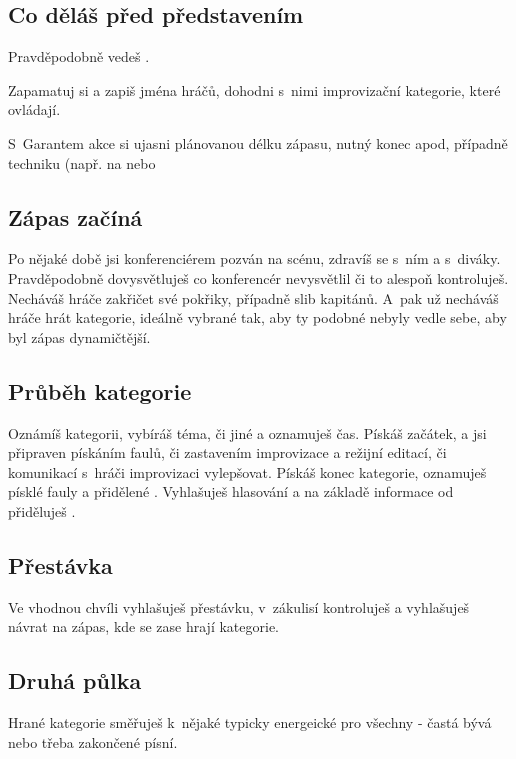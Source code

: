 \subsection{ Co děláš před představením } Pravděpodobně vedeš . 
 
Zapamatuj si a zapiš jména hráčů, dohodni s~nimi improvizační kategorie, které ovládají. 
 
S~Garantem akce si ujasni plánovanou délku zápasu, nutný konec apod, případně techniku (např. na  nebo  
 
\subsection{ Zápas začíná } Po nějaké době jsi konferenciérem pozván na scénu, zdravíš se s~ním a s~diváky. 
Pravděpodobně dovysvětluješ co konferencér nevysvětlil či to alespoň kontroluješ. 
Necháváš hráče zakřičet své pokřiky, případně slib kapitánů. 
A~pak už necháváš hráče hrát kategorie, ideálně vybrané tak, aby ty podobné nebyly vedle sebe, aby byl zápas dynamičtější. 
 
\subsection{ Průběh kategorie } Oznámíš kategorii, vybíráš téma, či jiné  a oznamuješ čas. 
Pískáš začátek, a jsi připraven pískáním faulů, či zastavením improvizace a režijní editací, či komunikací s~hráči improvizaci vylepšovat. 
Pískáš konec kategorie, oznamuješ písklé fauly a přidělené . 
Vyhlašuješ hlasování a na základě informace od  přiděluješ . 
 
\subsection{ Přestávka } Ve vhodnou chvíli vyhlašuješ přestávku, v~zákulisí kontroluješ a vyhlašuješ návrat na zápas, kde se zase hrají kategorie. 
 
\subsection{ Druhá půlka } Hrané kategorie směřuješ k~nějaké typicky energeické pro všechny -  častá bývá  nebo třeba  zakončené písní. 
 

